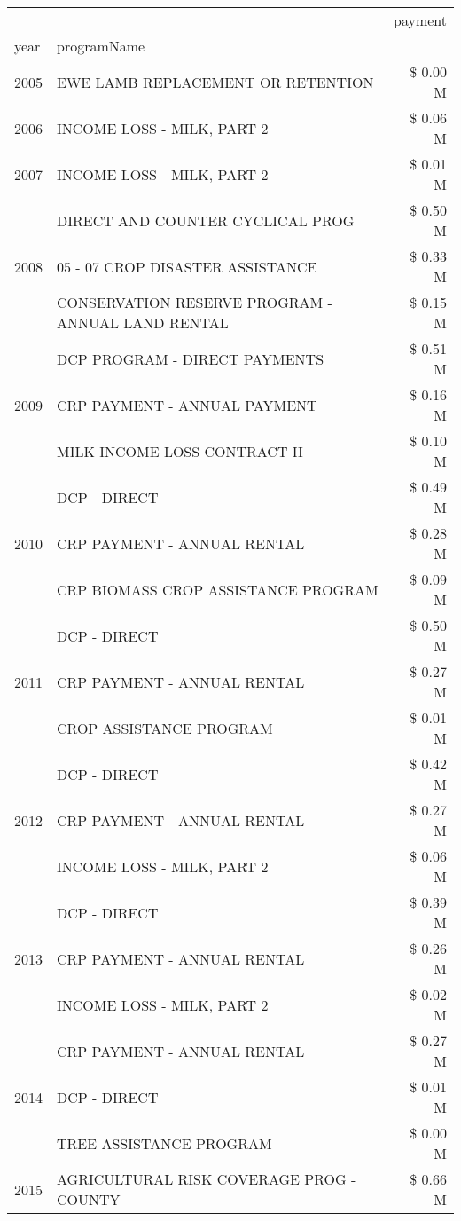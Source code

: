 \begin{tabular}{llr}
\toprule
 &  & payment \\
year & programName &  \\
\midrule
2005 & EWE LAMB REPLACEMENT OR RETENTION & \$ 0.00 M \\
\cline{1-3}
2006 & INCOME LOSS - MILK, PART 2 & \$ 0.06 M \\
\cline{1-3}
2007 & INCOME LOSS - MILK, PART 2 & \$ 0.01 M \\
\cline{1-3}
\multirow[t]{3}{*}{2008} & DIRECT AND COUNTER CYCLICAL PROG & \$ 0.50 M \\
 & 05 - 07 CROP DISASTER ASSISTANCE & \$ 0.33 M \\
 & CONSERVATION RESERVE PROGRAM - ANNUAL LAND RENTAL & \$ 0.15 M \\
\cline{1-3}
\multirow[t]{3}{*}{2009} & DCP PROGRAM - DIRECT PAYMENTS & \$ 0.51 M \\
 & CRP PAYMENT - ANNUAL PAYMENT & \$ 0.16 M \\
 & MILK INCOME LOSS CONTRACT II & \$ 0.10 M \\
\cline{1-3}
\multirow[t]{3}{*}{2010} & DCP - DIRECT & \$ 0.49 M \\
 & CRP PAYMENT - ANNUAL RENTAL & \$ 0.28 M \\
 & CRP BIOMASS CROP ASSISTANCE PROGRAM & \$ 0.09 M \\
\cline{1-3}
\multirow[t]{3}{*}{2011} & DCP - DIRECT & \$ 0.50 M \\
 & CRP PAYMENT - ANNUAL RENTAL & \$ 0.27 M \\
 & CROP ASSISTANCE PROGRAM & \$ 0.01 M \\
\cline{1-3}
\multirow[t]{3}{*}{2012} & DCP - DIRECT & \$ 0.42 M \\
 & CRP PAYMENT - ANNUAL RENTAL & \$ 0.27 M \\
 & INCOME LOSS - MILK, PART 2 & \$ 0.06 M \\
\cline{1-3}
\multirow[t]{3}{*}{2013} & DCP - DIRECT & \$ 0.39 M \\
 & CRP PAYMENT - ANNUAL RENTAL & \$ 0.26 M \\
 & INCOME LOSS - MILK, PART 2 & \$ 0.02 M \\
\cline{1-3}
\multirow[t]{3}{*}{2014} & CRP PAYMENT - ANNUAL RENTAL & \$ 0.27 M \\
 & DCP - DIRECT & \$ 0.01 M \\
 & TREE ASSISTANCE PROGRAM & \$ 0.00 M \\
\cline{1-3}
\multirow[t]{3}{*}{2015} & AGRICULTURAL RISK COVERAGE PROG - COUNTY & \$ 0.66 M \\

\end{tabular}
